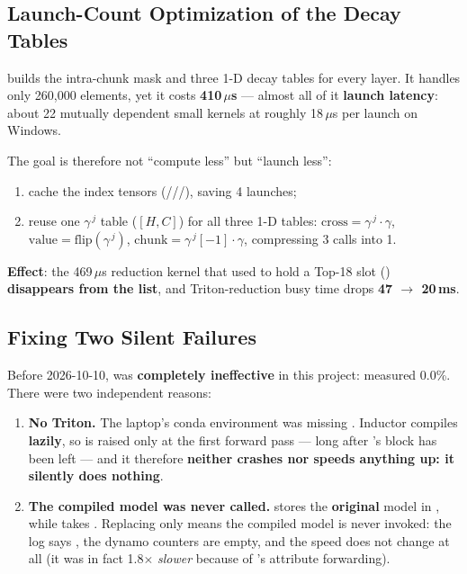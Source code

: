 \documentclass[11pt,openany]{article}
\begin{document}
\subsection{Launch-Count Optimization of the Decay Tables}
\label{sec:en-eng-decay}

 builds the intra-chunk mask and three 1-D decay tables for every
layer. It handles only 260{,}000 elements, yet it costs \textbf{410\,$\mu$s} --- almost all
of it \textbf{launch latency}: about 22 mutually dependent small kernels at roughly 18\,$\mu$s
per launch on Windows.

The goal is therefore not ``compute less'' but ``launch less'':

\begin{enumerate}
\item cache the index tensors (///), saving 4
      launches;
\item reuse one $\gamma^{\,j}$ table ($[H,C]$) for all three 1-D tables:
      $\text{cross} = \gamma^{\,j} \cdot \gamma$,
      $\text{value} = \text{flip}(\gamma^{\,j})$,
      $\text{chunk} = \gamma^{\,j}[-1] \cdot \gamma$, compressing 3  calls into 1.
\end{enumerate}

\textbf{Effect}: the 469\,$\mu$s reduction kernel that used to hold a Top-18 slot
()
\textbf{disappears from the list}, and Triton-reduction busy time drops \textbf{47 $\rightarrow$
20\,ms}.

\subsection{Fixing Two Silent  Failures}
\label{sec:en-eng-compile}

Before 2026-10-10,  was \textbf{completely ineffective} in this project:
measured 0.0\%. There were two independent reasons:

\begin{enumerate}
\item \textbf{No Triton.} The laptop's conda environment was missing .
      Inductor compiles \textbf{lazily}, so  is raised only at the first
      forward pass --- long after 's  block has been left --- and it
      therefore \textbf{neither crashes nor speeds anything up: it silently does nothing}.
\item \textbf{The compiled model was never called.}  stores the
      \textbf{original} model in , while  takes
      . Replacing only 
      means the compiled model is never invoked: the log says
      , the dynamo counters are empty, and the speed does not
      change at all (it was in fact 1.8$\times$ \emph{slower} because of
      's attribute forwarding).
\end{enumerate}
\end{document}
